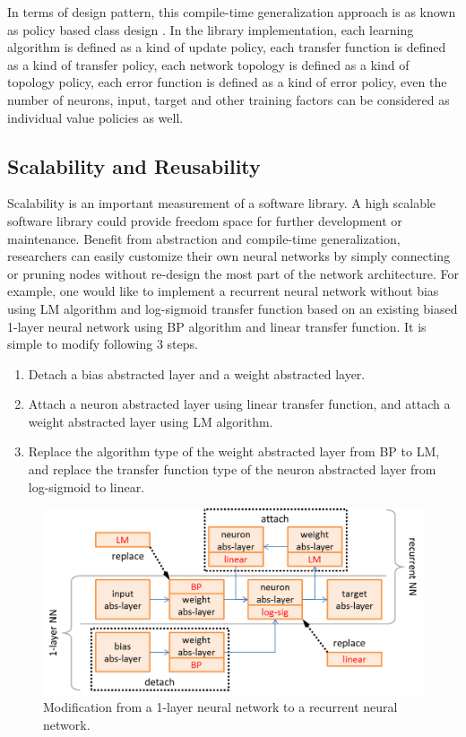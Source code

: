 \documentclass[procedia]{easychair}
\begin{document}
In terms of design pattern, this compile-time generalization approach is as known as policy based class design \cite{alexandrescu2001policy}.  In the library implementation, each learning algorithm is defined as a kind of update policy, each transfer function is defined as a kind of transfer policy, each network topology is defined as a kind of topology policy, each error function is defined as a kind of error policy, even the number of neurons, input, target and other training factors can be considered as individual value policies as well.

\subsection{Scalability and Reusability}

Scalability is an important measurement of a software library.  A high scalable software library could provide freedom space for further development or maintenance.  Benefit from abstraction and compile-time generalization, researchers can easily customize their own neural networks by simply connecting or pruning nodes without re-design the most part of the network architecture.  For example, one would like to implement a recurrent neural network without bias using LM algorithm and log-sigmoid transfer function based on an existing biased 1-layer neural network using BP algorithm and linear transfer function.  It is simple to modify following 3 steps.

\begin{enumerate}
    \item Detach a bias abstracted layer and a weight abstracted layer.
    \item Attach a neuron abstracted layer using linear transfer function, and attach a weight abstracted layer using LM algorithm.
    \item Replace the algorithm type of the weight abstracted layer from BP to LM, and replace the transfer function type of the neuron abstracted layer from log-sigmoid to linear.
\end{enumerate}

\begin{figure}[h]
    \begin{centering}
        \includegraphics[scale=0.5]{../../pic/reusability.png}
        \caption{Modification from a 1-layer neural network to a recurrent neural network.}
        \label{fig:reusability}
	\end{centering}
\end{figure}
\end{document}
